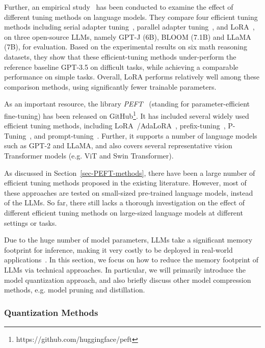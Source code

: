 Further, an empirical study~\cite{Hu-arXiv-2023} has been conducted to examine the effect of  different tuning methods on  language models. They compare four efficient tuning methods including  serial adapter tuning~\cite{Houlsby-ICML-2019-Parameter},  parallel adapter tuning~\cite{He-ICLR-2022-towards,Pfeiffer-EMNLP-2022-MAD-X}, and LoRA~\cite{Hu-ICLR-2022-LoRA}, on three open-source LLMs,   namely GPT-J (6B), BLOOM (7.1B) and LLaMA (7B), for evaluation.  Based on the experimental results on six math reasoning datasets, they show that these efficient-tuning methods  under-perform the reference baseline GPT-3.5 on difficult tasks, while achieving a comparable performance on simple tasks. Overall, LoRA performs relatively  well among these  comparison methods, using significantly fewer trainable parameters.     

As an important resource, the library \emph{PEFT}~\cite{peft-github-2022} (standing for parameter-efficient fine-tuning) has been released on GitHub\footnote{https://github.com/huggingface/peft}. It has included several widely used efficient tuning methods, including LoRA~\cite{Hu-ICLR-2022-LoRA}/AdaLoRA~\cite{Zhang-arXiv-2023-Adaptive}, prefix-tuning~\cite{Li-ACL-2021-prefix,Liu-arXiv-2021-P-tuning}, P-Tuning~\cite{Liu-arXiv-2021-GPT}, and prompt-tuning~\cite{Lester-ACL-2021-The}. Further, it supports a number of language models such as GPT-2 and LLaMA, and also covers several representative vision Transformer models (e.g. ViT and Swin Transformer).       

As  discussed in Section~\ref{sec-PEFT-methods}, there have been a large number of efficient tuning methods proposed in the existing literature. However,  most of these approaches are tested on  small-sized pre-trained  language models, instead of the LLMs. So far, there still lacks a thorough investigation on the effect of  different efficient tuning methods  on large-sized language models at different settings or tasks.  

Due to the huge number of model parameters, LLMs take a significant memory footprint for inference, making it very costly to be deployed in real-world applications~\cite{Wan-2024-Efficient-arXiv}. In this section, we focus on how to reduce the memory footprint of LLMs via technical approaches. In particular, we will primarily introduce the  model quantization approach, and also briefly discuss other model compression methods, e.g. model pruning and distillation. 

\subsubsection{Quantization Methods}

